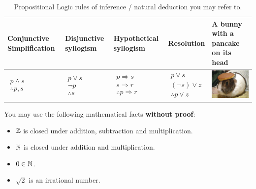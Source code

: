 \documentclass[letterpaper,10pt]{article}
\begin{document}
\begin{table}[H]
\begin{tabular}{|p{2.8cm}|p{2.8cm}|p{2.8cm}|p{2.8cm}| p{2.8cm}|}
		 \textbf{Conjunctive Simplification} & \textbf{Disjunctive syllogism} & \textbf{Hypothetical syllogism} &  \textbf{Resolution}  & \textbf{A bunny with a pancake on its head} \\ \hline
		 $\begin{aligned}
		p \land s \\
		\therefore p, s
	\end{aligned}$ 	& 
		$\begin{aligned}
		p \lor s \\
		\neg p \\
		\therefore s
	\end{aligned}$ &
	$\begin{aligned}
		p  \Rightarrow s \\
		s \Rightarrow r \\
		\therefore p \Rightarrow r
	\end{aligned}$ &  
	$\begin{aligned}
	p \lor s\\
	(\neg s )\lor z\\
	\therefore p \lor z
	\end{aligned}$ & \vspace{.1cm}
	\includegraphics[scale=.25]{img/pancake_bunny}\\ \hline
	\end{tabular} 
	\caption{Propositional Logic rules of inference / natural deduction you may refer to.}
	\label{tbl:propLogicRules}
\end{table} 

You may use the following mathematical facts {\bf without proof}:
{\large 
\begin{itemize}
	\item  $\mathbb{Z}$ is closed under addition, subtraction and multiplication.
	\item $\mathbb{N}$ is closed under addition and multiplication.
	\item  $0 \in \mathbb{N}$.
	\item $\sqrt2$ is an irrational number.
\end{itemize}
}
\end{document}
